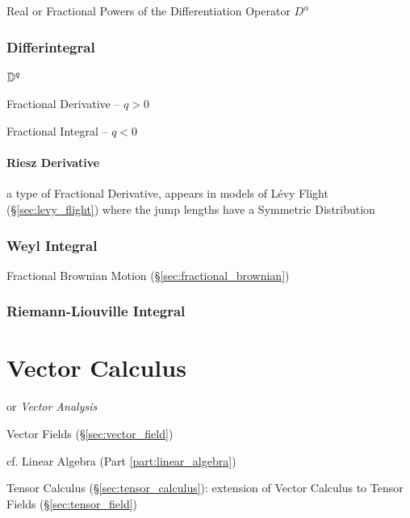 {Real or Fractional Powers of the Differentiation Operator $D^\alpha$



\subsubsection{Differintegral}\label{sec:differintegral}

$\mathbb{D}^q$

Fractional Derivative -- $q > 0$

Fractional Integral -- $q < 0$



\paragraph{Riesz Derivative}\label{sec:riesz_derivative}\hfill

a type of Fractional Derivative, appears in models of L\'evy Flight
(\S\ref{sec:levy_flight}) where the jump lengths have a Symmetric Distribution



\subsubsection{Weyl Integral}\label{sec:weyl_integral}

Fractional Brownian Motion (\S\ref{sec:fractional_brownian})



\subsubsection{Riemann-Liouville Integral}\label{sec:riemann_liouville}



\section{Vector Calculus}\label{sec:vector_calculus}

or \emph{Vector Analysis}

Vector Fields (\S\ref{sec:vector_field})

\fist cf. Linear Algebra (Part \ref{part:linear_algebra})

\fist Tensor Calculus (\S\ref{sec:tensor_calculus}): extension of Vector
Calculus to Tensor Fields (\S\ref{sec:tensor_field})

}
